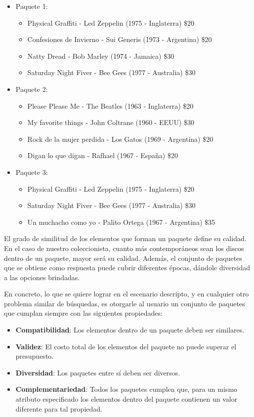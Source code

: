\begin{itemize}
  \item Paquete 1:
  \begin{itemize}
    \item Physical Graffiti - Led Zeppelin (1975 - Inglaterra) \$20
    \item Confesiones de Invierno - Sui Generis (1973 - Argentina) \$20
    \item Natty Dread - Bob Marley (1974 - Jamaica) \$30
		\item Saturday Night Fiver - Bee Gees (1977 - Australia) \$30
  \end{itemize}
  \item Paquete 2:
  \begin{itemize}
	  \item Please Please Me - The Beatles (1963 - Inglaterra) \$20
	  \item My favorite things - John Coltrane (1960 - EEUU) \$30
	  \item Rock de la mujer perdida - Los Gatos (1969 - Argentina) \$20
		\item Digan lo que digan - Rafhael (1967 - Espa\~na) \$20
  \end{itemize}
	  \item Paquete 3:
  \begin{itemize}
	  \item Physical Graffiti - Led Zeppelin (1975 - Inglaterra) \$20
		\item Saturday Night Fiver - Bee Gees (1977 - Australia) \$30
	  \item Un muchacho como yo - Palito Ortega (1967 - Argentina) \$35
  \end{itemize}
\end{itemize}


El grado de similitud de los elementos que forman un paquete define su calidad. En el caso de nuestro coleccionista, cuanto 
m\'as contempor\'aneos sean los discos dentro de un paquete, mayor ser\'a su calidad. Adem\'as, el conjunto de paquetes que se obtiene como respuesta puede cubrir diferentes \'epocas, d\'andole diversidad a las opciones brindadas. 

En concreto, lo que se quiere lograr en el escenario descripto, y en cualquier otro problema similar de b\'usquedas, es otorgarle al usuario un conjunto de paquetes que cumplan siempre con las siguientes propiedades: 

\begin{itemize}
  \item \textbf{Compatibilidad}: Los elementos dentro de un paquete deben ser similares.
  \item \textbf{Validez}: El costo total de los elementos del paquete no puede superar el presupuesto.
  \item \textbf{Diversidad}: Los paquetes entre s\'i deben ser diversos.
  \item \textbf{Complementariedad}: Todos los paquetes cumplen que, para un mismo atributo especificado los elementos dentro del paquete contienen un valor diferente para tal propiedad.
\end{itemize}

